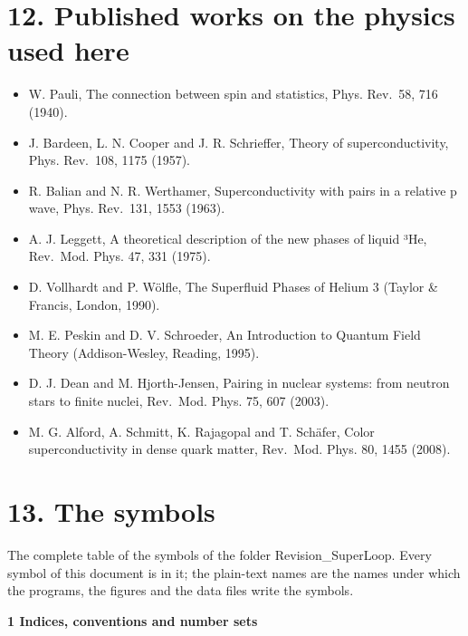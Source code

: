 \documentclass[
  10pt,
]{article}
\providecommand{\tightlist}{%
  \setlength{\itemsep}{0pt}\setlength{\parskip}{0pt}}
\begin{document}
\hypertarget{published-works-on-the-physics-used-here}{%
\section{12. Published works on the physics used
here}\label{published-works-on-the-physics-used-here}}

\begin{itemize}
\tightlist
\item
  W. Pauli, The connection between spin and statistics, Phys. Rev.~58,
  716 (1940).
\item
  J. Bardeen, L. N. Cooper and J. R. Schrieffer, Theory of
  superconductivity, Phys. Rev.~108, 1175 (1957).
\item
  R. Balian and N. R. Werthamer, Superconductivity with pairs in a
  relative p wave, Phys. Rev.~131, 1553 (1963).
\item
  A. J. Leggett, A theoretical description of the new phases of liquid
  ³He, Rev.~Mod. Phys. 47, 331 (1975).
\item
  D. Vollhardt and P. Wölfle, The Superfluid Phases of Helium 3 (Taylor
  \& Francis, London, 1990).
\item
  M. E. Peskin and D. V. Schroeder, An Introduction to Quantum Field
  Theory (Addison-Wesley, Reading, 1995).
\item
  D. J. Dean and M. Hjorth-Jensen, Pairing in nuclear systems: from
  neutron stars to finite nuclei, Rev.~Mod. Phys. 75, 607 (2003).
\item
  M. G. Alford, A. Schmitt, K. Rajagopal and T. Schäfer, Color
  superconductivity in dense quark matter, Rev.~Mod. Phys. 80, 1455
  (2008).
\end{itemize}

\hypertarget{the-symbols}{%
\section{13. The symbols}\label{the-symbols}}

The complete table of the symbols of the folder Revision\_SuperLoop.
Every symbol of this document is in it; the plain-text names are the
names under which the programs, the figures and the data files write the
symbols.

\textbf{1 Indices, conventions and number sets}
\end{document}
